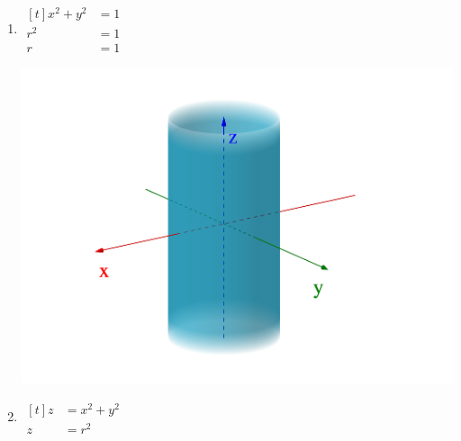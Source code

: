 \documentclass[11pt,fleqn]{book} %
\begin{document}
\begin{enumerate}
    \item
    \begin{minipage}[t]{0.25\linewidth}
        $\begin{aligned}[t]
            x^2 + y^2 & = 1 \\
            r^2       & = 1 \\
            r         & = 1
        \end{aligned}$
    \end{minipage}
    \begin{minipage}[c]{0.2\linewidth}
        \begin{center}
        \end{center}
    \end{minipage}
    \begin{minipage}[c]{0.5\linewidth}
        \begin{center} \includegraphics[width=0.9\linewidth]{Plots/e_1_2/1.png} \end{center}
    \end{minipage}

    \item
    \begin{minipage}[t]{0.25\linewidth}
        $\begin{aligned}[t]
            z & = x^2 + y^2 \\
            z & = r^2
        \end{aligned}$
    \end{minipage}
    \begin{minipage}[c]{0.2\linewidth}
        \begin{center}
\end{center}
\end{minipage}
\end{enumerate}
\end{document}
